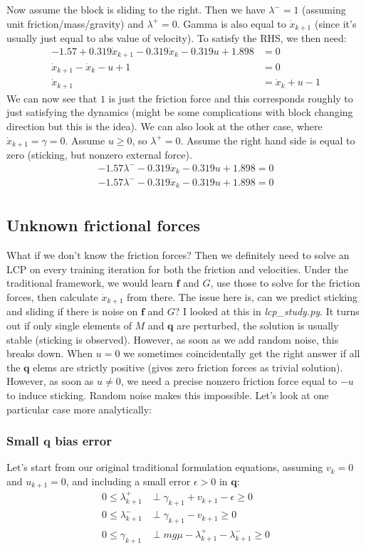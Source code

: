 \documentclass{article}
\renewcommand{\vec}[1]{\boldsymbol{#1}}
\begin{document}
Now assume the block is sliding to the right. Then we have $\lambda^- = 1$ (assuming unit friction/mass/gravity) and $\lambda^+ = 0$. Gamma is also equal to $\dot x_{k+1}$ (since it's usually just equal to abs value of velocity). To satisfy the RHS, we then need:
\begin{align*}
    - 1.57 + 0.319 \dot x_{k+1} - 0.319 \dot x_k - 0.319 u + 1.898 &= 0 \\
    \dot x_{k+1} - \dot x_k - u + 1 &= 0 \\
    \dot x_{k+1} &= \dot x_k + u - 1
\end{align*}
We can now see that $1$ is just the friction force and this corresponds roughly to just satisfying the dynamics (might be some complications with block changing direction but this is the idea). We can also look at the other case, where $\dot x_{k+1} = \gamma = 0$. Assume $u \geq 0$, so $\lambda^+ = 0$. Assume the right hand side is equal to zero (sticking, but nonzero external force).
\begin{align*}
    - 1.57 \lambda^- - 0.319 \dot x_k - 0.319 u + 1.898 = 0 \\
    - 1.57 \lambda^- - 0.319 \dot x_k - 0.319 u + 1.898 = 0 \\
\end{align*}

\subsection{Unknown frictional forces}
What if we don't know the friction forces? Then we definitely need to solve an LCP on every training iteration for both the friction and velocities. Under the traditional framework, we would learn $\vec{f}$ and $G$, use those to solve for the friction forces, then calculate $\dot x_{k+1}$ from there. The issue here is, can we predict sticking and sliding if there is noise on $\vec{f}$ and $G$? I looked at this in \textit{lcp\_study.py}. It turns out if only single elements of $M$ and $\vec{q}$ are perturbed, the solution is usually stable (sticking is observed). However, as soon as we add random noise, this breaks down. When $u=0$ we sometimes coincidentally get the right answer if all the $\vec{q}$ elems are strictly positive (gives zero friction forces as trivial solution). However, as soon as $u \neq 0$, we need a precise nonzero friction force equal to $-u$ to induce sticking. Random noise makes this impossible. Let's look at one particular case more analytically:

\subsubsection{Small $\vec{q}$ bias error}
Let's start from our original traditional formulation equations, assuming $v_k = 0$ and $u_{k+1} = 0$, and including a small error $\epsilon > 0$ in $\vec{q}$:
\begin{align*}
    0 \leq \lambda^+_{k+1} &\perp \gamma_{k+1} + v_{k+1} - \epsilon \geq 0\\
    0 \leq \lambda^-_{k+1} &\perp \gamma_{k+1} - v_{k+1} \geq 0\\
    0 \leq \gamma_{k+1} &\perp m g \mu - \lambda^+_{k+1} - \lambda^-_{k+1} \geq 0
\end{align*}
\end{document}
